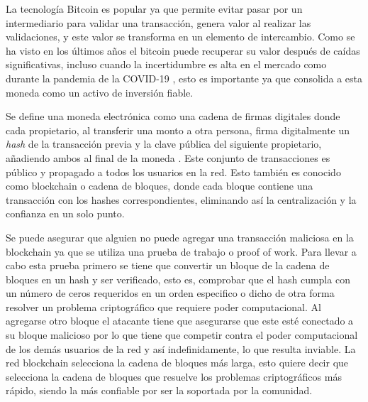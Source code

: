 La tecnología Bitcoin es popular ya que permite evitar pasar por un intermediario para validar una transacción, genera valor al realizar las validaciones, y este valor se transforma en un elemento de intercambio. Como se ha visto en los últimos años el bitcoin puede recuperar su valor después de caídas significativas, incluso cuando la incertidumbre es alta en el mercado como durante la pandemia de la COVID-19 \parencite{mudassirTimeseriesForecastingBitcoin2020}, esto es importante ya que consolida a esta moneda como un activo de inversión fiable.


Se define una moneda electrónica como una cadena de firmas digitales donde cada propietario, al transferir una monto a otra persona, firma digitalmente un \textit{hash} de la transacción previa y la clave pública del siguiente propietario, añadiendo ambos al final de la moneda \parencite{nakamotoBitcoinPeertoPeerElectronic2008}. Este conjunto de transacciones es público y propagado a todos los usuarios en la red. Esto también es conocido como blockchain o cadena de bloques, donde cada bloque contiene una transacción con los hashes correspondientes, eliminando así la centralización y la confianza en un solo punto.


Se puede asegurar que alguien no puede agregar una transacción maliciosa en la blockchain ya que se utiliza una prueba de trabajo o proof of work. Para llevar a cabo esta prueba primero se tiene que convertir un bloque de la cadena de bloques en un hash y ser verificado, esto es, comprobar que el hash cumpla con un número de ceros requeridos en un orden especifico o dicho de otra forma resolver un problema criptográfico que requiere poder computacional. Al agregarse otro bloque el atacante tiene que asegurarse que este esté conectado a su bloque malicioso por lo que tiene que competir contra el poder computacional de los demás usuarios de la red y así indefinidamente, lo que resulta inviable. La red blockchain selecciona la cadena de bloques más larga, esto quiere decir que selecciona la cadena de bloques que resuelve los problemas criptográficos más rápido, siendo la más confiable por ser la soportada por la comunidad.

